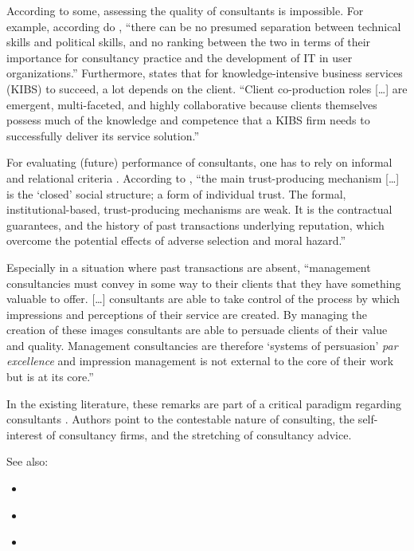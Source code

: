 \documentclass[12pt]{article}
\providecommand{\tightlist}{%
  \setlength{\itemsep}{0pt}\setlength{\parskip}{0pt}}
\begin{document}
According to some, assessing the quality of consultants is impossible.
For example, according do \citet[40]{bloomfield1995}, ``there can be no
presumed separation between technical skills and political skills, and
no ranking between the two in terms of their importance for consultancy
practice and the development of IT in user organizations.'' Furthermore,
\citet[101-102]{bettencourt2002} states that for knowledge-intensive
business services (KIBS) to succeed, a lot depends on the client.
``Client co-production roles {[}\ldots{]} are emergent, multi-faceted,
and highly collaborative because clients themselves possess much of the
knowledge and competence that a KIBS firm needs to successfully deliver
its service solution.''

For evaluating (future) performance of consultants, one has to rely on
informal and relational criteria \citep[ 277]{wright2002}. According to
\citet[250]{clark1993}, ``the main trust-producing mechanism
{[}\ldots{]} is the `closed' social structure; a form of individual
trust. The formal, institutional-based, trust-producing mechanisms are
weak. It is the contractual guarantees, and the history of past
transactions underlying reputation, which overcome the potential effects
of adverse selection and moral hazard.''

Especially in a situation where past transactions are absent,
``management consultancies must convey in some way to their clients that
they have something valuable to offer. {[}\ldots{]} consultants are able
to take control of the process by which impressions and perceptions of
their service are created. By managing the creation of these images
consultants are able to persuade clients of their value and quality.
Management consultancies are therefore `systems of persuasion' \emph{par
excellence} and impression management is not external to the core of
their work but is at its core.'' \citep[ 35]{clark1998}

In the existing literature, these remarks are part of a critical
paradigm regarding consultants \citep[ 4-5]{armbruster2006}. Authors
point to the contestable nature of consulting, the self-interest of
consultancy firms, and the stretching of consultancy advice.

See also:

\begin{itemize}
\tightlist
\item
  \citep{wright2002}
\item
  \citep{david2013}
\item
  \citep{mahoney2016}
\end{itemize}
\end{document}
